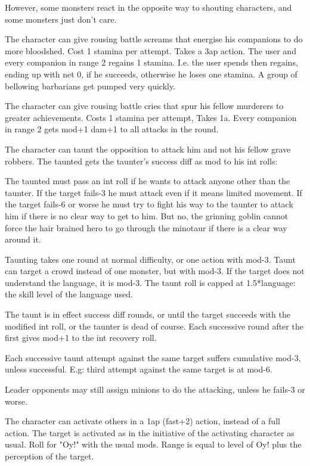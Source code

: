 However, some monsters react in the opposite way to shouting characters, and some monsters just don't care.


 The character can give rousing battle screams that energise his companions to do more bloodshed.
Cost 1 stamina per attempt. Takes a 3ap action. The user and every companion in range 2 regains 1 stamina. I.e. the user spends then regains, ending up with net 0, if he succeeds, otherwise he loses one stamina.
A group of bellowing barbarians get pumped very quickly.


 The character can give rousing battle cries that spur his fellow murderers to greater achievements.
Costs 1 stamina per attempt, Takes 1a. Every companion in range 2 gets mod+1 dam+1 to all attacks in the round.


 The character can taunt the opposition to attack him and not his fellow grave robbers. The taunted gets the taunter's success diff as mod to his int rolls:

The taunted must pass an int roll if he wants to attack anyone other than the taunter. If the target fails-3 he must attack even if it means limited movement. If the target fails-6 or worse he must try to fight his way to the taunter to attack him if there is no clear way to get to him. But no, the grinning goblin cannot force the hair brained hero to go through the minotaur if there is a clear way around it.

Taunting takes one round at normal difficulty, or one action with mod-3. Taunt can target a crowd instead of one monster, but with mod-3. If the target does not understand the language, it is mod-3. The taunt roll is capped at 1.5*language: the skill level of the language used.

The taunt is in effect success diff rounds, or until the target succeeds with the modified int roll, or the taunter is dead of course. Each successive round after the first gives mod+1 to the int recovery roll.

Each successive taunt attempt against the same target suffers cumulative mod-3, unless successful. E.g: third attempt against the same target is at mod-6.

Leader opponents may still assign minions to do the attacking, unless he fails-3 or worse.


 The character can activate others in a 1ap (fast+2) action, instead of a full action. The target is activated as in the initiative of the activating character as usual.
Roll for "Oy!" with the usual mods. Range is equal to level of Oy! plus the perception of the target.

